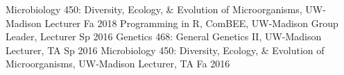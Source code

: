 

\begin{cvhonors}
  \cvhonor
    {Microbiology 450: Diversity, Ecology, \& Evolution of Microorganisms, UW-Madison}
    {Lecturer}
    {Fa 2018}
  \cvhonor
    {Programming in R, ComBEE, UW-Madison}
    {Group Leader, Lecturer}
    {Sp 2016}
  \cvhonor
    {Genetics 468: General Genetics II, UW-Madison}
    {Lecturer, TA}
    {Sp 2016}
  \cvhonor
    {Microbiology 450: Diversity, Ecology, \& Evolution of Microorganisms, UW-Madison}
    {Lecturer, TA}
    {Fa 2016}
\end{cvhonors}